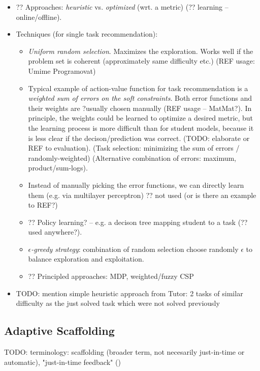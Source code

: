 \begin{itemize}
\item ?? Approaches: \emph{heuristic} vs. \emph{optimized} (wrt. a metric)
  (?? learning -- online/offline).
\item Techniques (for single task recommendation):
\begin{itemize}
\item \emph{Uniform random selection}. Maximizes the exploration.
  Works well if the problem set is coherent (approximately same difficulty etc.)
  (REF usage: Umime Programovat)
\item Typical example of action-value function for task recommendation is
  a \emph{weighted sum of errors on the soft constraints}.
  Both error functions and their weights are ?usually chosen manually
  (REF usage -- MatMat?).
  In principle, the weights could be learned to optimize a desired metric, but the
  learning process is more difficult than for student models,
  because it is less clear if the decison/prediction was correct.
  (TODO: elaborate or REF to evaluation).
  (Task selection: minimizing the sum of errors / randomly-weighted)
  (Alternative combination of errors: maximum, product/sum-logs).
\item Instead of manually picking the error functions, we can directly learn
  them (e.g. via multilayer perceptron) %
  ?? not used (or is there an example to REF?)
\item ?? Policy learning? -- e.g. a decison tree mapping student to a task
  (?? used anywhere?).
\item \emph{$\epsilon$-greedy strategy}: combination of random selection choose randomly $\epsilon$
  to balance exploration and exploitation.
\item ?? Principled approaches: MDP, weighted/fuzzy CSP
\end{itemize}
\item TODO: mention simple heuristic approach from Tutor: 2 tasks of similar difficulty as the just solved task which were not solved previously




\end{itemize}


\subsection{Adaptive Scaffolding}

TODO: terminology:
  scaffolding (broader term, not necesarily just-in-time or automatic),
  "just-in-time feedback" (\cite{student-models-review-2012})

